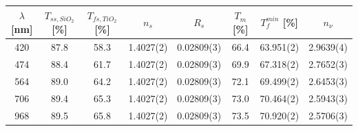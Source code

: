 \documentclass[a4paper,11pt]{article}
\begin{document}
                \begin{tabular}{|c|c|c|c|c|c|c|c|}
                    \hline
                    $\lambda$ [nm] &  $T_{ss, SiO_2}$ [\%]  & $T_{fs, TiO_2}$ [\%] & $n_s$ & $R_s$ & $T_m$ [\%] & $T^{min}_f$ [\%] & $n_{\nu}$ \\
                    \hline
                    420 & 87.8 & 58.3 & 1.4027(2) & 0.02809(3) & 66.4 & 63.951(2) & 2.9639(4) \\
                    \hline
                    474 & 88.4 & 61.7 & 1.4027(2) & 0.02809(3) & 69.9 & 67.318(2) & 2.7652(3) \\
                    \hline
                    564 & 89.0 & 64.2 & 1.4027(2) & 0.02809(3) & 72.1 & 69.499(2) & 2.6453(3) \\
                    \hline
                    706 & 89.4 & 65.3 & 1.4027(2) & 0.02809(3) & 73.0 & 70.464(2) & 2.5943(3) \\
                    \hline
                    968 & 89.5 & 65.8 & 1.4027(2) & 0.02809(3) & 73.5 & 70.920(2) & 2.5706(3) \\
                    \hline
                \end{tabular}
                \captionsetup{justification=centering, font=footnotesize}
                \vspace{20pt}
                \raggedright
\newpage
\end{document}
